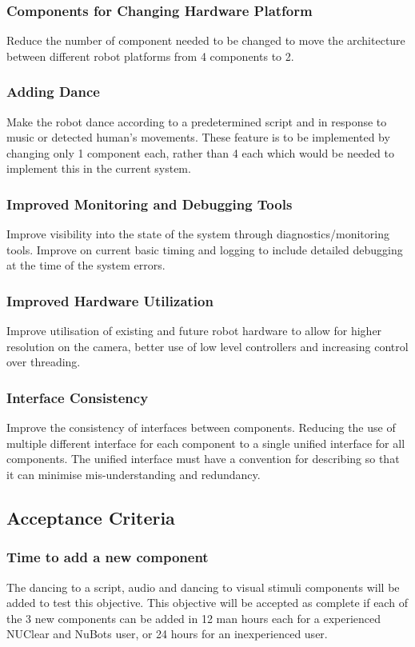 \documentclass[a4paper]{article}
\begin{document}
			\subsubsection{Components for Changing Hardware Platform}
				Reduce the number of component needed to be changed to move the architecture between different robot platforms from 4 components to 2.
			\subsubsection{Adding Dance}
				Make the robot dance according to a predetermined script and in response to music or detected human’s movements. These feature is to be implemented by changing only 1 component each, rather than 4 each which would be needed to implement this in the current system. 

			\subsubsection{Improved Monitoring and Debugging Tools}
				 Improve visibility into the state of the system through diagnostics/monitoring tools. Improve on current basic timing and logging to include detailed debugging at the time of the system errors.
			\subsubsection{Improved Hardware Utilization}
				 Improve utilisation of existing and future robot hardware to allow for higher resolution on the camera, better use of low level controllers and increasing control over threading.
			\subsubsection{Interface Consistency}
				 Improve the consistency of interfaces between components. Reducing the use of multiple different interface for each component to a single unified interface for all components. The unified interface must have a convention for describing so that it can minimise mis-understanding and redundancy.
				
		\subsection {Acceptance Criteria}
			\subsubsection{Time to add a new component}
				The dancing to a script, audio and dancing to visual stimuli components will be added to test this objective. This objective will be accepted as complete if each of the 3 new components can be added in 12 man hours each for a experienced NUClear and NuBots user, or 24 hours for an inexperienced user.
\end{document}

